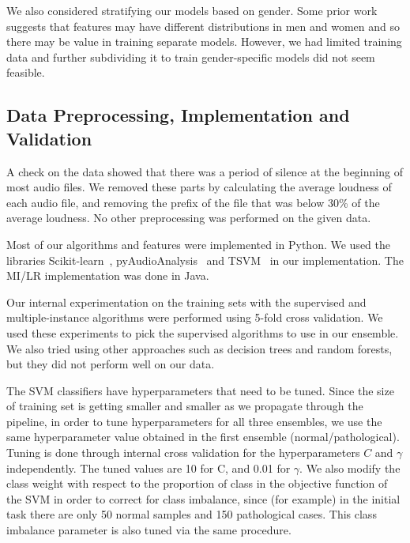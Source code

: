 We also considered stratifying our models based on gender. Some prior work suggests that features may have different distributions in men and women and so there may be value in training separate models. However, we had limited training data and further subdividing it to train gender-specific models did not seem feasible.

\subsection{Data Preprocessing, Implementation and Validation}
A check on the data showed that there was a period of silence at the beginning of most audio files. We removed these parts by calculating the average loudness of each audio file, and removing the prefix of the file that was below  30\% of the average loudness. No other preprocessing was performed on the given data.

Most of our algorithms and features were implemented in Python. We used the libraries Scikit-learn~\cite{b17}, pyAudioAnalysis~\cite{b6} and TSVM~\cite{b23,b24} in our implementation. The MI/LR implementation was done in Java.

Our internal experimentation on the training sets with the supervised and multiple-instance algorithms were performed using 5-fold cross validation. We used these experiments to pick the supervised algorithms to use in our ensemble. We also tried using other approaches such as decision trees and random forests, but they did not perform well on our data.

The SVM classifiers have hyperparameters that need to be tuned. Since the size of training set is getting smaller and smaller as we propagate through the pipeline, in order to tune hyperparameters for all three ensembles, we use the same hyperparameter value obtained in the first ensemble (normal/pathological). Tuning is done through internal cross validation for the hyperparameters $C$ and $\gamma$ independently. The tuned values are 10 for C, and 0.01 for $\gamma$. We also modify the class weight with respect to the proportion of class in the objective function of the SVM in order to correct for class imbalance, since (for example) in the initial task there are only 50 normal samples and 150 pathological cases. This class imbalance parameter is also tuned via the same procedure. 

